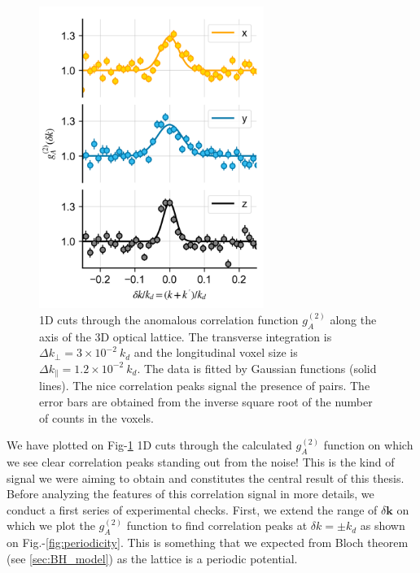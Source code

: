 \begin{figure}[ht!]
    \centering
    \includegraphics[width=0.65\textwidth]{Fig/Chapter4/correlations_kmk_errorbars.png}
    \caption[1D cuts through the anomalous correlation function $g_{A}^{(2)}$ along the axis of the 3D optical lattice]{1D cuts through the anomalous correlation function $g_{A}^{(2)}$ along the axis of the 3D optical lattice. The transverse integration is $\Delta k_{\perp}=3 \times 10^{-2} \ k_d$ and the longitudinal voxel size is $\Delta k_{\parallel}=1.2 \times 10^{-2} \ k_d$. The data is fitted by Gaussian functions (solid lines). The nice correlation peaks signal the presence of \kmk pairs. The error bars are obtained from the inverse square root of the number of counts in the voxels.}
    \label{fig:kmk_signal}
\end{figure}

We have plotted on Fig-\ref{fig:kmk_signal} 1D cuts through the calculated $g_{A}^{(2)}$ function on which we see clear correlation peaks standing out from the noise! This is the kind of signal we were aiming to obtain and constitutes the central result of this thesis. Before analyzing the features of this correlation signal in more details, we conduct a first series of experimental checks. First, we extend the range of $\delta \bm{k}$ on which we plot the $g_{A}^{(2)}$ function to find correlation peaks at $\delta k = \pm k_d$ as shown on Fig.-\ref{fig:periodicity}. This is something that we expected from Bloch theorem (see \ref{sec:BH_model}) as the lattice is a periodic potential.

